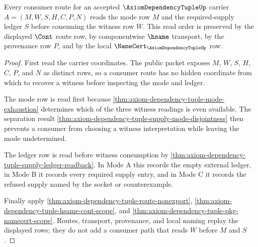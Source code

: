 \begin{theorem}
\label{thm:axiom-dependency-tuple-consumer-ledger-order}
Every consumer route for an accepted $\AxiomDependencyTupleUp$ carrier
$A=(M,W,S,H,C,P,N)$ reads the mode row $M$ and the required-supply ledger $S$
before consuming the witness row $W$. This read order is preserved by the
displayed $\Cont$ route row, by componentwise $\hsame$ transport, by the
provenance row $P$, and by the local $\NameCert_{\AxiomDependencyTupleUp}$ row.
\end{theorem}
\begin{proof}
First read the carrier coordinates. The public packet exposes $M$, $W$, $S$,
$H$, $C$, $P$, and $N$ as distinct rows, so a consumer route has no hidden
coordinate from which to recover a witness before inspecting the mode and
ledger.

The mode row is read first because
\autoref{thm:axiom-dependency-tuple-mode-exhaustion} determines which of the
three witness readings is even available. The separation result
\autoref{thm:axiom-dependency-tuple-supply-mode-disjointness} then prevents a
consumer from choosing a witness interpretation while leaving the mode
undetermined.

The ledger row is read before witness consumption by
\autoref{thm:axiom-dependency-tuple-supply-ledger-readback}. In Mode A this
records the empty external ledger, in Mode B it records every required supply
entry, and in Mode C it records the refused supply named by the socket or
counterexample.

Finally apply \autoref{thm:axiom-dependency-tuple-route-nonexport},
\autoref{thm:axiom-dependency-tuple-hsame-cont-scope}, and
\autoref{thm:axiom-dependency-tuple-pkg-namecert-scope}. Routes, transport,
provenance, and local naming replay the displayed rows; they do not add a
consumer path that reads $W$ before $M$ and $S$.
\end{proof}

